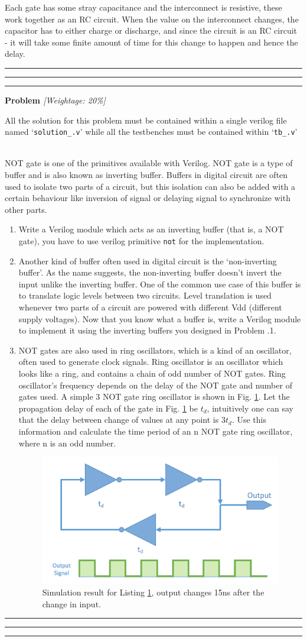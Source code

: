 \documentclass[a4paper,10pt]{article}
\theoremstyle{mytheor}
\newcounter{problemNumber}
\newcommand {
  \insertProblem}[2]{
  \vspace{0.5cm}
  \hrule \hrule \hrule
  \vspace{0.3cm}
  
  {
    \setlength{\parindent}{0}

    {
      \color{greatblue}
      \textbf{\Large{Problem \theproblemNumber}}
      \hfill
      \textit{[Weightage: #1]}
    }

    {
      \centering
      \begin{center}
        \lfseries \footnotesize All the solution for this problem
        must be contained within a single verilog file named
        `\texttt{solution\_\theproblemNumber.v}' while all the
        testbenches must be contained within
          `\texttt{tb\_\theproblemNumber.v}'
        \end{center}
      }
      
    }
    
  \vspace{6pt}\\#2

  \addtocounter{problemNumber}{1}

  \vspace{0.2cm}
  \hrule \hrule \hrule
  \vspace{0.5cm}
}
\newcounter{infoCount} %
\newcommand{\infocounter}[1]{%
  \refstepcounter{infoCount}%
  \theinfoCount%
  \label{#1}}%
\newcommand{\info}[3] {
  \begin{tcolorbox}[arc=1pt,colback=infocolor!5!white,colframe=infocolor!75!black,title=\textbf{Info \infocounter{#2} - #1}]  
    #3
  \end{tcolorbox}
  \addtocounter{infoCount}{1}
}
\newcommand{\inlinev}[1]{\lstinline[style=verilog-inline-style]{#1}}
\begin{document}
\info{Why do gates have delay?}{info:gates-delay}{ Each gate has some stray capacitance
  and the interconnect is resistive, these work together as an RC
  circuit. When the value on the interconnect changes, the capacitor
  has to either charge or discharge, and since the circuit is an RC
  circuit - it will take some finite amount of time for this change to
  happen and hence the delay.}

\insertProblem {20\%} { NOT gate is one of the primitives available with
  Verilog. NOT gate is a type of buffer and is also known as inverting
  buffer. Buffers in digital circuit are often used to isolate two
  parts of a circuit, but this isolation can also be added with a
  certain behaviour like inversion of signal or delaying signal to
  synchronize with other parts.
  
  \begin {enumerate}
  \item Write a Verilog module which acts as an inverting buffer (that
    is, a NOT gate), you have to use verilog primitive \inlinev{not}
    for the implementation.
  \item Another kind of buffer often used in digital circuit is the
    `non-inverting buffer'. As the name suggests, the non-inverting
    buffer doesn't invert the input unlike the inverting buffer. One
    of the common use case of this buffer is to translate logic levels
    between two circuits. Level translation is used whenever two parts
    of a circuit are powered with different Vdd (different supply
    voltages). Now that you know what a buffer is, write a Verilog
    module to implement it using the inverting buffers you designed in
    Problem {\theproblemNumber}.1.
  \item NOT gates are also used in ring oscillators, which is a kind
    of an oscillator, often used to generate clock signals. Ring
    oscillator is an oscillator which looks like a ring, and contains
    a chain of odd number of NOT gates. Ring oscillator's frequency
    depends on the delay of the NOT gate and number of gates used. A
    simple 3 NOT gate ring oscillator is shown in
    Fig. \ref{ring-oscillator}. Let the propagation delay of each of
    the gate in Fig. \ref{ring-oscillator} be $t_d$, intuitively one
    can say that the delay between change of values at any point is
    $3t_d$. Use this information and calculate the time period of an n
    NOT gate ring oscillator, where n is an odd number.

    \begin{figure}[!h] \centering  
      \includegraphics[width=0.5\linewidth]{./resources/ringOscillator.pdf}
      \caption{Simulation result for Listing \ref{ring-oscillator},
        output changes 15ns after the change in input.}
      \label{ring-oscillator}
    \end{figure}


\end{enumerate}}
\end{document}
